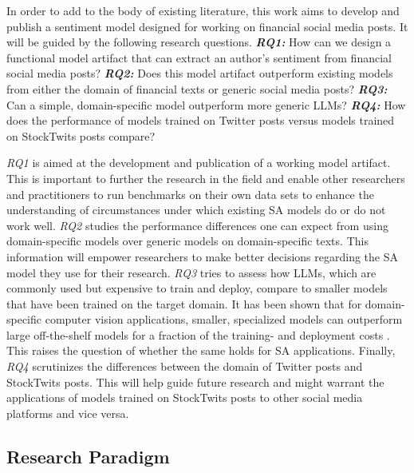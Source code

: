 In order to add to the body of existing literature, this work aims to develop and publish a sentiment model designed for working on financial social media posts. It will be guided by the following research questions.\newline
\textbf{\emph{RQ1:}} How can we design a functional model artifact that can extract an author's sentiment from financial social media posts?\newline
\textbf{\emph{RQ2:}} Does this model artifact outperform existing models from either the domain of financial texts or generic social media posts?\newline
\textbf{\emph{RQ3:}} Can a simple, domain-specific model outperform more generic LLMs?\newline
\textbf{\emph{RQ4:}} How does the performance of models trained on Twitter posts versus models trained on StockTwits posts compare?

\emph{RQ1} is aimed at the development and publication of a working model artifact. This is important to further the research in the field and enable other researchers and practitioners to run benchmarks on their own data sets to enhance the understanding of circumstances under which existing SA models do or do not work well. \emph{RQ2} studies the performance differences one can expect from using domain-specific models over generic models on domain-specific texts. This information will empower researchers to make better decisions regarding the SA model they use for their research. \emph{RQ3} tries to assess how LLMs, which are commonly used but expensive to train and deploy, compare to smaller models that have been trained on the target domain. It has been shown that for domain-specific computer vision applications, smaller, specialized models can outperform large off-the-shelf models for a fraction of the training- and deployment costs . This raises the question of whether the same holds for SA applications. Finally, \emph{RQ4} scrutinizes the differences between the domain of Twitter posts and StockTwits posts. This will help guide future research and might warrant the applications of models trained on StockTwits posts to other social media platforms and vice versa.


\subsection{Research Paradigm}


